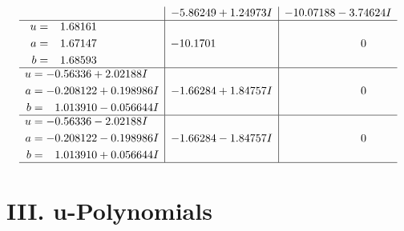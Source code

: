 \documentclass[1p]{elsarticle_modified}
\theoremstyle{definition}
\begin{document}
$$\begin{array}{c|c|c}
 & -5.86249 + 1.24973 I & -10.07188 - 3.74624 I \\ \hline\begin{aligned}
u &= \phantom{-}1.68161\phantom{ +0.000000I} \\
a &= \phantom{-}1.67147\phantom{ +0.000000I} \\
b &= \phantom{-}1.68593\phantom{ +0.000000I}\end{aligned}
 & -10.1701\phantom{ +0.000000I} & \phantom{-0.000000 } 0 \\ \hline\begin{aligned}
u &= -0.56336 + 2.02188 I \\
a &= -0.208122 + 0.198986 I \\
b &= \phantom{-}1.013910 - 0.056644 I\end{aligned}
 & -1.66284 + 1.84757 I & \phantom{-0.000000 } 0 \\ \hline\begin{aligned}
u &= -0.56336 - 2.02188 I \\
a &= -0.208122 - 0.198986 I \\
b &= \phantom{-}1.013910 + 0.056644 I\end{aligned}
 & -1.66284 - 1.84757 I & \phantom{-0.000000 } 0\\
 \hline 
 \end{array}$$\newpage
\newpage\renewcommand{\arraystretch}{1}
\centering \section*{ III. u-Polynomials}
\end{document}
